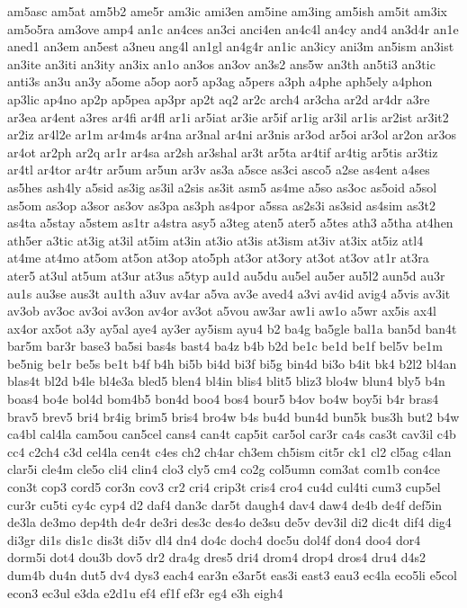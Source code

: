 am5asc
am5at
am5b2
ame5r
am3ic
ami3en
am5ine
am3ing
am5ish
am5it
am3ix
am5o5ra
am3ove
amp4
an1c
an4ces
an3ci
anci4en
an4c4l
an4cy
and4
an3d4r
an1e
aned1
an3em
an5est
a3neu
ang4l
an1gl
an4g4r
an1ic
an3icy
ani3m
an5ism
an3ist
an3ite
an3iti
an3ity
an3ix
an1o
an3os
an3ov
an3s2
ans5w
an3th
an5ti3
an3tic
anti3s
an3u
an3y
a5ome
a5op
aor5
ap3ag
a5pers
a3ph
a4phe
aph5ely
a4phon
ap3lic
ap4no
ap2p
ap5pea
ap3pr
ap2t
aq2
ar2c
arch4
ar3cha
ar2d
ar4dr
a3re
ar3ea
ar4ent
a3res
ar4fi
ar4fl
ar1i
ar5iat
ar3ie
ar5if
ar1ig
ar3il
ar1is
ar2ist
ar3it2
ar2iz
ar4l2e
ar1m
ar4m4s
ar4na
ar3nal
ar4ni
ar3nis
ar3od
ar5oi
ar3ol
ar2on
ar3os
ar4ot
ar2ph
ar2q
ar1r
ar4sa
ar2sh
ar3shal
ar3t
ar5ta
ar4tif
ar4tig
ar5tis
ar3tiz
ar4tl
ar4tor
ar4tr
ar5um
ar5un
ar3v
as3a
a5sce
as3ci
asco5
a2se
as4ent
a4ses
as5hes
ash4ly
a5sid
as3ig
as3il
a2sis
as3it
asm5
as4me
a5so
as3oc
as5oid
a5sol
as5om
as3op
a3sor
as3ov
as3pa
as3ph
as4por
a5ssa
as2s3i
as3sid
as4sim
as3t2
as4ta
a5stay
a5stem
as1tr
a4stra
asy5
a3teg
aten5
ater5
a5tes
ath3
a5tha
at4hen
ath5er
a3tic
at3ig
at3il
at5im
at3in
at3io
at3is
at3ism
at3iv
at3ix
at5iz
atl4
at4me
at4mo
at5om
at5on
at3op
ato5ph
at3or
at3ory
at3ot
at3ov
at1r
at3ra
ater5
at3ul
at5um
at3ur
at3us
a5typ
au1d
au5du
au5el
au5er
au5l2
aun5d
au3r
au1s
au3se
aus3t
au1th
a3uv
av4ar
a5va
av3e
aved4
a3vi
av4id
avig4
a5vis
av3it
av3ob
av3oc
av3oi
av3on
av4or
av3ot
a5vou
aw3ar
aw1i
aw1o
a5wr
ax5is
ax4l
ax4or
ax5ot
a3y
ay5al
aye4
ay3er
ay5ism
ayu4
b2
ba4g
ba5gle
bal1a
ban5d
ban4t
bar5m
bar3r
base3
ba5si
bas4s
bast4
ba4z
b4b
b2d
be1c
be1d
be1f
bel5v
be1m
be5nig
be1r
be5s
be1t
b4f
b4h
bi5b
bi4d
bi3f
bi5g
bin4d
bi3o
b4it
bk4
b2l2
bl4an
blas4t
bl2d
b4le
bl4e3a
bled5
blen4
bl4in
blis4
blit5
bliz3
blo4w
blun4
bly5
b4n
boas4
bo4e
bol4d
bom4b5
bon4d
boo4
bos4
bour5
b4ov
bo4w
boy5i
b4r
bras4
brav5
brev5
bri4
br4ig
brim5
bris4
bro4w
b4s
bu4d
bun4d
bun5k
bus3h
but2
b4w
ca4bl
cal4la
cam5ou
can5cel
cans4
can4t
cap5it
car5ol
car3r
ca4s
cas3t
cav3il
c4b
cc4
c2ch4
c3d
cel4la
cen4t
c4es
ch2
ch4ar
ch3em
ch5ism
cit5r
ck1
cl2
cl5ag
c4lan
clar5i
cle4m
cle5o
cli4
clin4
clo3
cly5
cm4
co2g
col5umn
com3at
com1b
con4ce
con3t
cop3
cord5
cor3n
cov3
cr2
cri4
crip3t
cris4
cro4
cu4d
cul4ti
cum3
cup5el
cur3r
cu5ti
cy4c
cyp4
d2
daf4
dan3c
dar5t
daugh4
dav4
daw4
de4b
de4f
def5in
de3la
de3mo
dep4th
de4r
de3ri
des3c
des4o
de3su
de5v
dev3il
di2
dic4t
dif4
dig4
di3gr
di1s
dis1c
dis3t
di5v
dl4
dn4
do4c
doch4
doc5u
dol4f
don4
doo4
dor4
dorm5i
dot4
dou3b
dov5
dr2
dra4g
dres5
dri4
drom4
drop4
dros4
dru4
d4s2
dum4b
du4n
dut5
dv4
dys3
each4
ear3n
e3ar5t
eas3i
east3
eau3
ec4la
eco5li
e5col
econ3
ec3ul
e3da
e2d1u
ef4
ef1f
ef3r
eg4
e3h
eigh4
